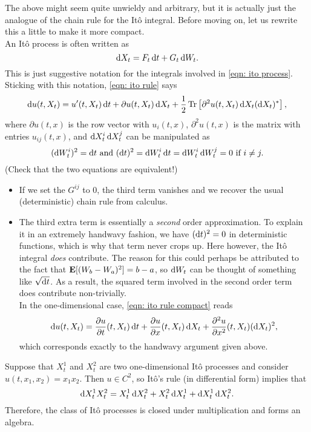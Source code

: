 The above might seem quite unwieldy and arbitrary, but it is actually just the analogue of the chain rule for the It\^{o} integral. Before moving on, let us rewrite this a little to make it more compact.\\
An It\^{o} process is often written as
\[ \operatorname{d}\!{X}_t = F_t \operatorname{d}\!{t} + G_t\operatorname{d}\!{W}_t. \]
This is just suggestive notation for the integrals involved in \eqref{eqn: ito process}. Sticking with this notation, \eqref{eqn: ito rule} says
\begin{equation}
	\label{eqn: ito rule compact}
	\operatorname{d}\!{u}(t,X_t) = u'(t,X_t)\operatorname{d}\!{t} + \partial u(t,X_t)\operatorname{d}\!{X}_t + \frac{1}{2} \operatorname{Tr}\left[\partial^2 u(t,X_t) \operatorname{d}\!{X}_t(\operatorname{d}\!{X}_t)^*\right],
\end{equation}
where $\partial u(t,x)$ is the row vector with $u_i(t,x)$, $\partial^2 u(t,x)$ is the matrix with entries $u_{ij}(t,x)$, and $\operatorname{d}\!{X}^i_t\operatorname{d}\!{X}^j_t$ can be manipulated as
\[ (\operatorname{d}\!{W}^i_t)^2 = \operatorname{d}\!{t} \text{ and } (\operatorname{d}\!{t})^2 = \operatorname{d}\!{W}^i_t\operatorname{d}\!{t} = \operatorname{d}\!{W}^i_t\operatorname{d}\!{W}^j_t = 0 \text{ if } i\neq j. \]
(Check that the two equations are equivalent!)
\begin{itemize}
	\item If we set the $G^{ij}$ to $0$, the third term vanishes and we recover the usual (deterministic) chain rule from calculus.
	\item The third extra term is essentially a \textit{second} order approximation. To explain it in an extremely handwavy fashion, we have $(\operatorname{d}\!{t})^2 = 0$ in deterministic functions, which is why that term never crops up. Here however, the It\^{o} integral \textit{does} contribute. The reason for this could perhaps be attributed to the fact that $\textbf{E}[(W_b-W_a)^2] = b-a$, so $\operatorname{d}\!{W}_t$ can be thought of something like $\sqrt{\operatorname{d}\!{t}}$. As a result, the squared term involved in the second order term does contribute non-trivially.\\
	In the one-dimensional case, \eqref{eqn: ito rule compact} reads
	\[ \operatorname{d}\!{u}(t,X_t) = \frac{\partial u}{\partial t} (t,X_t)\operatorname{d}\!{t} + \frac{\partial u}{\partial x} (t,X_t)\operatorname{d}\!{X_t} + \frac{\partial^2 u}{\partial x^2}(t,X_t) (\operatorname{d}\!{X}_t)^2, \]
	which corresponds exactly to the handwavy argument given above.
\end{itemize}

Suppose that $X^1_t$ and $X^2_t$ are two one-dimensional It\^{o} processes and consider $u(t,x_1,x_2)=x_1x_2$. Then $u\in C^2$, so It\^{o}'s rule (in differential form) implies that
\[ \operatorname{d}\!{X_t^1 X_t^2} = X_t^1 \operatorname{d}\!{X}_t^2 + X_t^2 \operatorname{d}\!{X}_t^1 + \operatorname{d}\!{X}_t^1\operatorname{d}\!{X}_t^2. \]
Therefore, the class of It\^{o} processes is closed under multiplication and forms an algebra.

